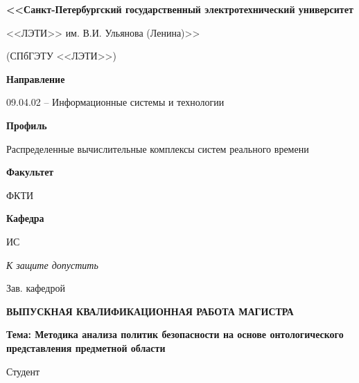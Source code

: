 \documentclass[../main]{subfiles}
\begin{document}
\begin{titlepage}
    \centering
    
    {\bfseries\small
        <<Санкт-Петербургский государственный электротехнический университет

        <<ЛЭТИ>> им. В.И. Ульянова (Ленина)>>
        
        (СПбГЭТУ <<ЛЭТИ>>)
    }

    \vspace{1cm}
    
    \textbf{Направление}\hfill\begin{minipage}[t]{12cm}
        09.04.02 -- Информационные системы и технологии
    \end{minipage}

    \textbf{Профиль}\hfill\begin{minipage}[t]{12cm}
        Распределенные вычислительные комплексы систем реального времени
    \end{minipage}\newline
    
    \textbf{Факультет}\hfill\begin{minipage}[t]{12cm}
        ФКТИ
    \end{minipage}
    
    \textbf{Кафедра}\hfill\begin{minipage}[t]{12cm}
        ИС
    \end{minipage}
    
    \vspace{1cm}

    \textit{К защите допустить}\hspace{\fill}
    
    Зав. кафедрой \hfill 
     
    
    \vspace{1cm}
    
    \MakeUppercase{\bfseries\large
        выпускная квалификационная работа магистра
    }

    {\bfseries
        Тема: Методика анализа политик безопасности на основе онтологического представления предметной области
    }

    \vfill
    
    Студент\hfill 
     
    

\end{titlepage}
\end{document}
